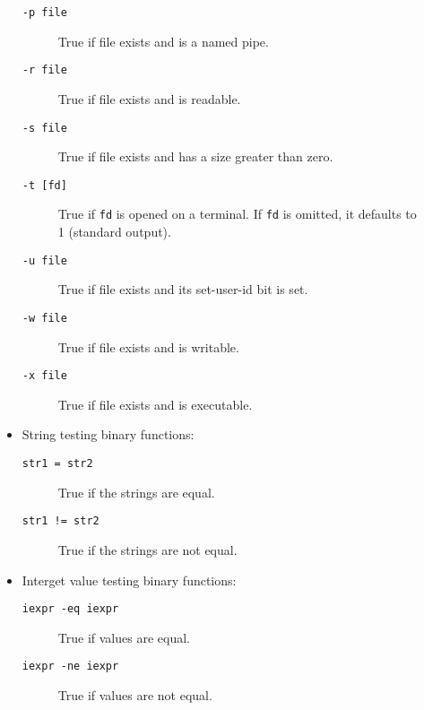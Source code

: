 \begin{description}
\begin{itemize}
\begin{description}
\item[{\tt -p file}] \mbox{}

True if file exists and is a named pipe.

\item[{\tt -r file}] \mbox{}

True if file exists and is readable.

\item[{\tt -s file}] \mbox{}

True if file exists and has a size greater than zero.

\item[{\tt -t {[fd]}}] \mbox{}

True if {\tt fd} is opened on a terminal. 
If {\tt fd} is omitted, it defaults to 1 (standard output).

\item[{\tt -u file}] \mbox{}

True if file exists and its set-user-id bit is set.

\item[{\tt -w file}] \mbox{}

True if file exists and is writable.

\item[{\tt -x file}] \mbox{}

True if file exists and is executable.

\end{description}

\item String testing binary functions:
\begin{description}
\item[{\tt str1 = str2}] \mbox{}

True if the strings are equal.

\item[{\tt str1 != str2}] \mbox{}

True if the strings are not equal.

\end{description}

\item Interget value testing binary functions:
\begin{description}
\item[{\tt iexpr -eq iexpr}] \mbox{}

True if values are equal.

\item[{\tt iexpr -ne iexpr}] \mbox{}

True if values are not equal.


\end{description}
\end{itemize}
\end{description}
